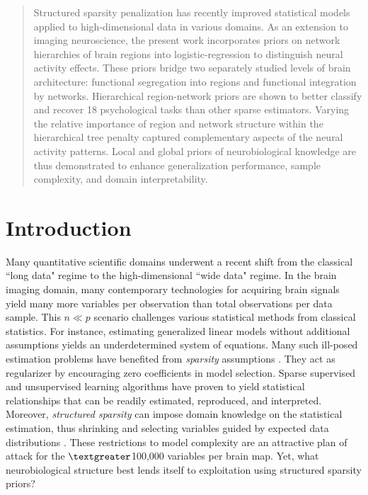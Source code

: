 \documentclass[runningheads,a4paper]{llncs}
\begin{document}
\maketitle


\begin{abstract}
    Structured sparsity penalization has recently improved
    statistical models applied to high-dimensional data in various domains.
    As an extension to imaging neuroscience,
    the present work incorporates
    priors on network hierarchies of brain regions into
    logistic-regression to distinguish neural activity effects.
    These priors bridge two separately studied levels
    of brain architecture:
    functional segregation into regions and
    functional integration by networks.
    Hierarchical region-network priors are shown to better classify
    and recover 
    18 psychological tasks than other sparse estimators.
    Varying the relative importance of
    region and network structure within the hierarchical tree penalty
    captured complementary aspects of the neural activity patterns.
    Local and global priors of neurobiological knowledge
    are thus demonstrated to enhance
    generalization performance, sample complexity, and domain interpretability.
\end{abstract}


\section{Introduction}
Many quantitative scientific domains underwent a
recent shift from the classical ``long data" regime to
the high-dimensional ``wide data" regime.
In the brain imaging domain,
many contemporary technologies for acquiring brain signals yield many
more variables per observation than
total observations per data sample.
This $n \ll p$ scenario challenges various statistical methods from
classical statistics.
For instance,
estimating generalized linear models without additional assumptions
yields an underdetermined system of equations.
%
Many such ill-posed estimation problems
have benefited from
\textit{sparsity} assumptions
\cite{bach2012optimization}.
They act as regularizer by encouraging zero coefficients
in model selection.
Sparse supervised and unsupervised
learning algorithms have proven to yield
statistical relationships that can be readily
estimated, reproduced, and interpreted.
%
Moreover, \textit{structured sparsity} can impose
domain knowledge on the 
statistical estimation,
thus shrinking and selecting variables guided by
expected data distributions
\cite{bach2012optimization}.
These restrictions to model complexity
are an attractive plan of attack
for the $\textgreater$100,000 variables per brain map.
Yet, what neurobiological structure best lends itself
to exploitation using structured sparsity priors?
\end{document}
